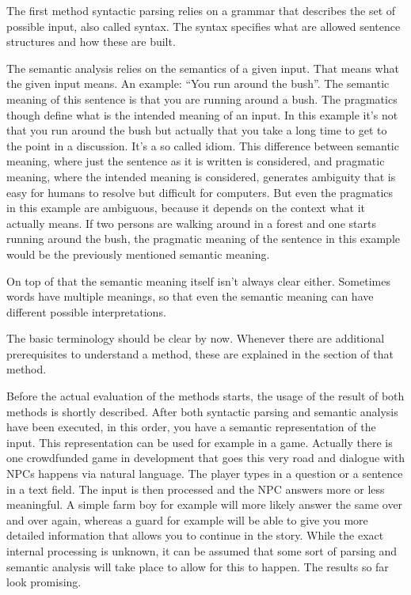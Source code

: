 \documentclass[12pt,twoside]{scrartcl}
\theoremstyle{plain}
\theoremstyle{definition}
\theoremstyle{remark}
\begin{document}
	The first method syntactic parsing relies on a grammar that describes the set of possible input, also called syntax. The syntax specifies what are allowed sentence structures and how these are built.
	
	The semantic analysis relies on the semantics of a given input. That means what the given input means. An example: ``You run around the bush''. The semantic meaning of this sentence is that you are running around a bush. 
	The pragmatics though define what is the intended meaning of an input. In this example it's not that you run around the bush but actually that you take a long time to get to the point in a discussion. It's a so called idiom. This difference between semantic meaning, where just the sentence as it is written is considered, and pragmatic meaning, where the intended meaning is considered, generates ambiguity that is easy for humans to resolve but difficult for computers. But even the pragmatics in this example are ambiguous, because it depends on the context what it actually means. If two persons are walking around in a forest and one starts running around the bush, the pragmatic meaning of the sentence in this example would be the previously mentioned semantic meaning.
	
	On top of that the semantic meaning itself isn't always clear either. Sometimes words have multiple meanings, so that even the semantic meaning can have different possible interpretations.
	
	The basic terminology should be clear by now. Whenever there are additional prerequisites to understand a method, these are explained in the section of that method.
	
	Before the actual evaluation of the methods starts, the usage of the result of both methods is shortly described. After both syntactic parsing and semantic analysis have been executed, in this order, you have a semantic representation of the input. This representation can be used for example in a game. Actually there is one crowdfunded game in development that goes this very road and dialogue with NPCs happens via natural language. The player types in a question or a sentence in a text field. The input is then processed and the NPC answers more or less meaningful. A simple farm boy for example will more likely answer the same over and over again, whereas a guard for example will be able to give you more detailed information that allows you to continue in the story. While the exact internal processing is unknown, it can be assumed that some sort of parsing and semantic analysis will take place to allow for this to happen. The results so far look promising.\cite{Portalarium2013}
	
\end{document}

